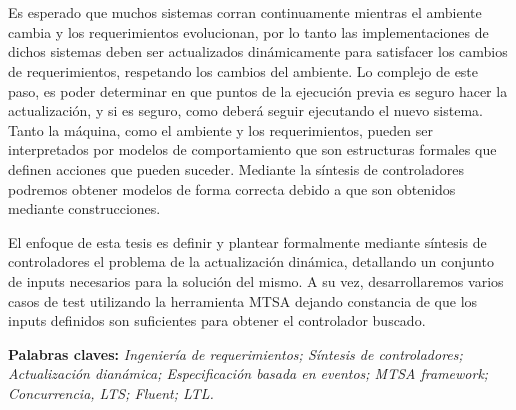 \chapter*{\runtitulo}

\noindent Es esperado que muchos sistemas corran continuamente mientras el ambiente cambia y los
requerimientos evolucionan, por lo tanto las implementaciones de dichos sistemas deben ser
actualizados dinámicamente para satisfacer los cambios de requerimientos, respetando los cambios
del ambiente. Lo complejo de este paso, es poder determinar en que puntos de la ejecución previa
es seguro hacer la actualización, y si es seguro, como deberá seguir ejecutando el nuevo sistema.
Tanto la máquina, como el ambiente y los requerimientos, pueden ser interpretados por modelos de 
comportamiento que son estructuras formales que definen acciones que pueden suceder. Mediante la
síntesis de controladores podremos obtener modelos de forma correcta debido a que son obtenidos 
mediante construcciones. 

\noindent El enfoque de esta tesis es definir y plantear formalmente mediante síntesis de
controladores el problema de la actualización dinámica, detallando un conjunto de inputs 
necesarios para la solución del mismo. A su vez, desarrollaremos varios casos de test utilizando la
herramienta MTSA dejando constancia de que los inputs definidos son suficientes para obtener el
controlador buscado.

 
\bigskip

\noindent\textbf{Palabras claves:} \textit{Ingeniería de requerimientos; Síntesis de controladores;
Actualización dianámica; Especificación basada en eventos; MTSA framework; Concurrencia, LTS;
Fluent; LTL.}
